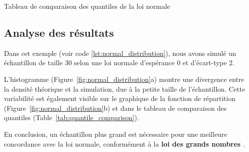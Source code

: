     \begin{table}[H]
        \centering
        \caption{Tableau de comparaison des quantiles de la loi normale}
        \label{tab:quantile_comparison}
    \end{table}

    \subsection{Analyse des résultats}
        Dans cet exemple (voir code \ref{lst:normal_distribution}), nous avons simulé un échantillon de taille 30 selon une loi normale d'espérance $0$ et d'écart-type $2$.

        L'histogramme (Figure~\ref{fig:normal_distribution}a) montre une divergence entre la densité théorique et la simulation, due à la petite taille de l'échantillon. Cette variabilité est également visible sur le graphique de la fonction de répartition (Figure~\ref{fig:normal_distribution}b) et dans le tableau de comparaison des quantiles (Table~\ref{tab:quantile_comparison}).

        En conclusion, un échantillon plus grand est nécessaire pour une meilleure concordance avec la loi normale, conformément à la \textbf{loi des grands nombres} \cite{lawoflargeNumbers}.
\smallskip